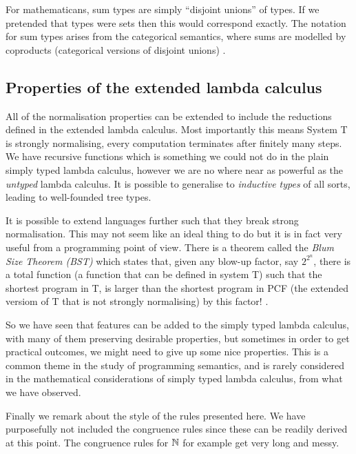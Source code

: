 \begin{remark}
    For mathematicans, sum types are simply ``disjoint unions'' of types. If we pretended that types were sets then this would correspond exactly. The notation for sum types arises from the categorical semantics, where sums are modelled by coproducts (categorical versions of disjoint unions) \cite{LambekJ1986Itho}. 
\end{remark}

\subsection{Properties of the extended lambda calculus}

All of the normalisation properties can be extended to include the reductions defined in the extended lambda calculus. Most importantly this means System T is strongly normalising, every computation terminates after finitely many steps.
We have recursive functions which is something we could not do in the plain simply typed lambda calculus, however we are no where near as powerful as the \emph{untyped} lambda calculus. It is possible to generalise to \emph{inductive types} of all sorts, leading to well-founded tree types.

It is possible to extend languages further such that they break strong normalisation. This may not seem like an ideal thing to do but it is in fact very useful from a programming point of view. There is a theorem called the \emph{Blum Size Theorem (BST)} which states that, given any blow-up factor, say $2^{2^n}$, there is a total function (a function that can be defined in system T) such that the shortest program in T, is larger than the shortest program in PCF (the extended versiom of T that is not strongly normalising) by this factor! \cite{harper_2016}.

So we have seen that features can be added to the simply typed lambda calculus, with many of them preserving desirable properties, but sometimes in order to get practical outcomes, we might need to give up some nice properties. This is a common theme in the study of programming semantics, and is rarely considered in the mathematical considerations of simply typed lambda calculus, from what we have observed.

\begin{remark}
    Finally we remark about the style of the rules presented here. We have purposefully not included the congruence rules since these can be readily derived at this point. The congruence rules for $\mathbb{N}$ for example get very long and messy.
\end{remark}


